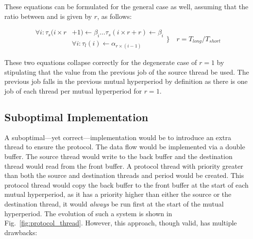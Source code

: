 These equations can be formulated for the general case as well,
assuming that the ratio between \plong and \pshort is given by $r$, as
follows:

\begin{displaymath}
  \begin{split}
    \forall i:
    \tau_s(i\times r&+1)\gets\beta_i\ldots\tau_s(i\times r+r)\gets\beta_i\\
    & \forall i:\tau_l(i)\gets\alpha_{r\times(i-1)}
  \end{split}
  \Bigg\}\quad r=T_{long}/T_{short}
\end{displaymath}

These two equations collapse correctly for the degenerate case of
$r=1$ by stipulating that the value from the previous job of the
source thread be used. The previous job falls in the previous mutual
hyperperiod by definition as there is one job of each thread per
mutual hyperperiod for $r=1$.

\subsection{Suboptimal Implementation}
A suboptimal---yet correct---implementation would be to introduce an
extra thread to ensure the protocol. The data flow would be
implemented via a double buffer. The source thread would write to the
back buffer and the destination thread would read from the front
buffer. A protocol thread with priority greater than both the source
and destination threads and period \plong would be created. This
protocol thread would copy the back buffer to the front buffer at the
start of each mutual hyperperiod, as it has a priority higher than
either the source or the destination thread, it would \emph{always} be
run first at the start of the mutual hyperperiod. The evolution of
such a system is shown in Fig.~\ref{fig:protocol_thread}. However,
this approach, though valid, has multiple drawbacks:

